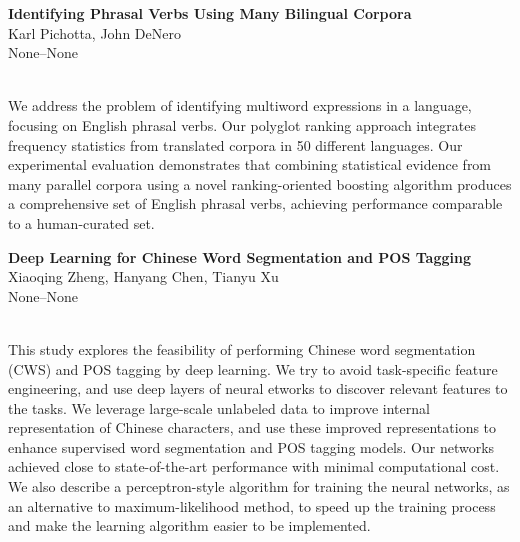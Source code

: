 \documentclass[twoside,makeidx]{book}
\begin{document}
\par\vspace{2em}\noindent%
\begin{minipage}{\linewidth}%
\begin{center}
\textbf{\normalsize Identifying Phrasal Verbs Using Many Bilingual Corpora}\\
\normalsize  Karl Pichotta,  John DeNero\\
{\small None--None}\\
\end{center}
\end{minipage}\\[0.5em]
\nopagebreak%
\noindent%
{\small We address the problem of identifying multiword expressions in a language, focusing on English phrasal verbs. Our polyglot ranking approach integrates frequency statistics from translated corpora in 50 different languages.  Our experimental evaluation demonstrates that combining statistical evidence from many parallel corpora using a novel ranking-oriented boosting algorithm produces a comprehensive set of English phrasal verbs, achieving performance comparable to a human-curated set.}
\par\vspace{2em}\noindent%
\begin{minipage}{\linewidth}%
\begin{center}
\textbf{\normalsize Deep Learning for Chinese Word Segmentation and POS Tagging}\\
\normalsize  Xiaoqing Zheng,  Hanyang Chen,  Tianyu Xu\\
{\small None--None}\\
\end{center}
\end{minipage}\\[0.5em]
\nopagebreak%
\noindent%
{\small This study explores the feasibility of performing Chinese word segmentation (CWS) and POS tagging by deep learning. We try to avoid task-specific feature engineering, and use deep layers of neural etworks to discover relevant features to the tasks. We leverage large-scale unlabeled data to improve internal representation of Chinese characters, and use these improved representations to enhance supervised word segmentation and POS tagging models. Our networks achieved close to state-of-the-art performance with minimal computational cost. We also describe a perceptron-style algorithm for training the neural networks, as an alternative to maximum-likelihood method, to speed up the training process and make the learning algorithm easier to be implemented.}
\end{document}
